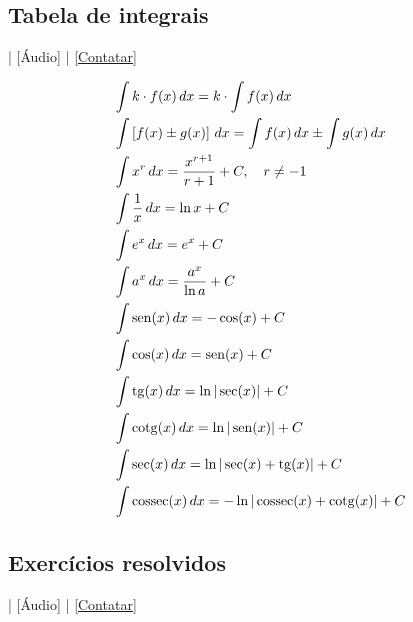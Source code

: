 \subsection{Tabela de integrais}

\begin{flushright}
  [Vídeo] | [Áudio] | \href{https://phkonzen.github.io/notas/contato.html}{[Contatar]}
\end{flushright}

\begin{small}
\begin{align}
  & \int k\cdot f(x)\,dx = k\cdot\int f(x)\,dx\\
  & \int \left[f(x)\pm g(x)\right]\,dx = \int f(x)\,dx \pm \int g(x)\,dx\\
  & \int x^r\,dx = \frac{x^{r+1}}{r+1} + C,\quad r\neq -1\\
  & \int \frac{1}{x}\,dx = \ln x + C \\
  & \int e^x\,dx = e^x + C \\
  & \int a^x\,dx = \frac{a^x}{\ln a} + C \\
  & \int \operatorname{sen}(x)\,dx = -\cos(x) + C \\
  & \int \cos(x)\,dx = \operatorname{sen}(x) + C \\
  & \int \operatorname{tg}(x)\,dx = \ln|\sec(x)| + C \\
  & \int \operatorname{cotg}(x)\,dx = \ln|\operatorname{sen}(x)| + C \\
  & \int \sec(x)\,dx = \ln|\sec(x)+\operatorname{tg}(x)| + C \\
  & \int \operatorname{cossec}(x)\,dx = -\ln|\operatorname{cossec}(x)+\operatorname{cotg}(x)| + C
\end{align}
\end{small}


\subsection*{Exercícios resolvidos}

\begin{flushright}
  [Vídeo] | [Áudio] | \href{https://phkonzen.github.io/notas/contato.html}{[Contatar]}
\end{flushright}

